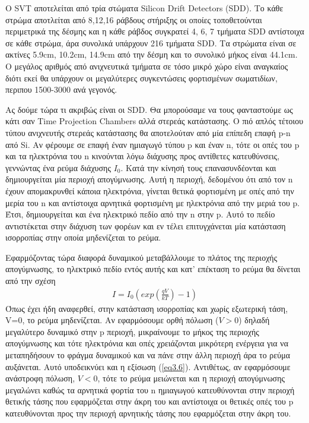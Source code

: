 	
	Ο SVT αποτελείται από τρία στώματα Silicon Drift Detectors (SDD). Το κάθε στρώμα αποτλείται από 8,12,16 ράβδους στήριξης οι οποίες τοποθετούνται περιμετρικά της δέσμης και η κάθε ράβδος συγκρατεί 4, 6, 7 τμήματα SDD αντίστοιχα σε κάθε στρώμα, άρα συνολικά υπάρχουν 216 τμήματα SDD. Τα στρώματα είναι σε ακτίνες 5.9cm, 10.2cm, 14.9cm από την δέσμη και το συνολικό μήκος είναι 44.1cm. Ο μεγάλος αριθμός από ανιχνευτικά τμήματα σε τόσο μικρό χώρο είναι αναγκαίος διότι εκεί θα υπάρχουν οι μεγαλύτερες συγκεντώσεις φορτισμένων σωματιδίων, περιπου 1500-3000 ανά γεγονός. 
	
	Ας δούμε τώρα τι ακριβώς είναι οι SDD. Θα μπορούσαμε να τους φανταστούμε ως  κάτι σαν Time Projection Chambers αλλά στερεάς κατάστασης. Ο πιό απλός τέτοιου τύπου ανιχνευτής στερεάς κατάστασης θα αποτελούταν από μία επίπεδη επαφή p-n από Si. Αν φέρουμε σε επαφή έναν ημιαγωγό τύπου p και έναν n, τότε οι οπές του p και τα ηλεκτρόνια του n κινούνται λόγω διάχυσης προς αντίθετες κατευθύνσεις, γεννώντας ένα ρεύμα διάχυσης $I_0$. Κατά την κίνησή τους επανασυνδέονται και δημιουργείται μία περιοχή απογύμνωσης. 
	Αυτή η περιοχή, δεδομένου ότι από τον n έχουν απομακρυνθεί κάποια ηλεκτρόνια, γίνεται θετικά φορτισμένη με οπές από την μερία του n και αντίστοιχα αρνητικά φορτισμένη με ηλεκτρόνια από την μεριά του p. Έτσι, δημιουργείται και ένα ηλεκτρικό πεδίο από την n στην p. Αυτό το πεδίο αντιστέκεται στην διάχυση των φορέων και εν τέλει επιτυγχάνεται μία κατάσταση ισορροπίας στην οποία μηδενίζεται το ρεύμα.
	
	 Εφαρμόζοντας τώρα διαφορά δυναμικού μεταβάλλουμε το πλάτος της περιοχής απογύμνωσης, το ηλεκτρικό πεδίο εντός αυτής και κατ' επέκταση το ρεύμα θα δίνεται από την σχέση 
	 \begin{align}\label{eq3.6}
	 	I = I_0 (exp(\frac{qV}{kT})-1) 
	 \end{align}
	Όπως έχει ήδη αναφερθεί, στην κατάσταση ισορροπίας και χωρίς εξωτερική τάση, V=0, το ρεύμα μηδενίζεται. Αν εφαρμόσουμε ορθή πόλωση ($V>0$) δηλαδή μεγαλύτερο δυναμικό στην p περιοχή, μικραίνουμε το μήκος της περιοχής απογύμνωσης και τότε ηλεκτρόνια και οπές χρειάζονται μικρότερη ενέργεια για να μεταπηδήσουν το φράγμα δυναμικού και να πάνε στην άλλη περιοχή άρα το ρεύμα αυξάνεται. Αυτό υποδεικνύει και η εξίσωση (\ref{eq3.6}). 
	Αντιθέτως, αν εφαρμόσουμε ανάστροφη πόλωση, $V<0$, τότε το ρεύμα μειώνεται και η περιοχή απογύμνωσης μεγαλώνει καθώς τα αρνητικά φορτία του n ημιαγωγού κατευθύνονται στην περιοχή θετικής τάσης που εφαρμόζεται στην άκρη του και αντίστοιχα οι θετικές οπές του p κατευθύνονται προς την περιοχή αρνητικής τάσης που εφαρμόζεται στην άκρη του.
	
